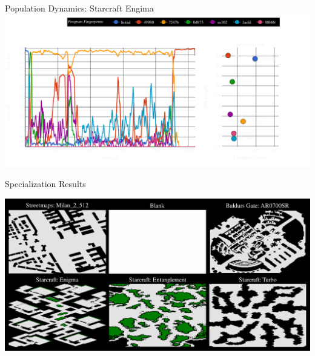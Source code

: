 \documentclass[aspectratio=169]{beamer}
\begin{document}
\begin{frame}{Population Dynamics: Starcraft Engima}
    \includegraphics[width=1.0\linewidth, keepaspectratio]{figures/pheno.pdf}
\end{frame}

\begin{frame}{Specialization Results}
    
    \includegraphics[width=1.0\linewidth, keepaspectratio]{figures/show_maps_exp.pdf}
\end{frame}
\end{document}
